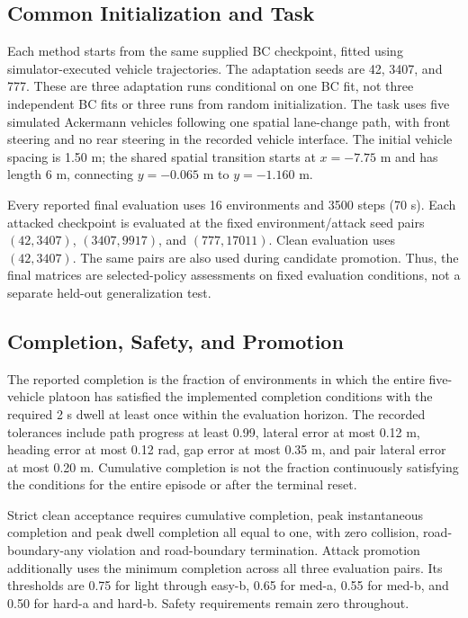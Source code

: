 \documentclass[lettersize,journal]{IEEEtran}
\begin{document}
\subsection{Common Initialization and Task}
Each method starts from the same supplied BC checkpoint, fitted using simulator-executed vehicle trajectories. The adaptation seeds are 42, 3407, and 777. These are three adaptation runs conditional on one BC fit, not three independent BC fits or three runs from random initialization. The task uses five simulated Ackermann vehicles following one spatial lane-change path, with front steering and no rear steering in the recorded vehicle interface. The initial vehicle spacing is 1.50 m; the shared spatial transition starts at $x=-7.75$ m and has length 6 m, connecting $y=-0.065$ m to $y=-1.160$ m.

Every reported final evaluation uses 16 environments and 3500 steps (70 s). Each attacked checkpoint is evaluated at the fixed environment/attack seed pairs $(42,3407)$, $(3407,9917)$, and $(777,17011)$. Clean evaluation uses $(42,3407)$. The same pairs are also used during candidate promotion. Thus, the final matrices are selected-policy assessments on fixed evaluation conditions, not a separate held-out generalization test.

\subsection{Completion, Safety, and Promotion}
The reported completion is the fraction of environments in which the entire five-vehicle platoon has satisfied the implemented completion conditions with the required 2 s dwell at least once within the evaluation horizon. The recorded tolerances include path progress at least 0.99, lateral error at most 0.12 m, heading error at most 0.12 rad, gap error at most 0.35 m, and pair lateral error at most 0.20 m. Cumulative completion is not the fraction continuously satisfying the conditions for the entire episode or after the terminal reset.

Strict clean acceptance requires cumulative completion, peak instantaneous completion and peak dwell completion all equal to one, with zero collision, road-boundary-any violation and road-boundary termination. Attack promotion additionally uses the minimum completion across all three evaluation pairs. Its thresholds are 0.75 for light through easy-b, 0.65 for med-a, 0.55 for med-b, and 0.50 for hard-a and hard-b. Safety requirements remain zero throughout.
\end{document}
